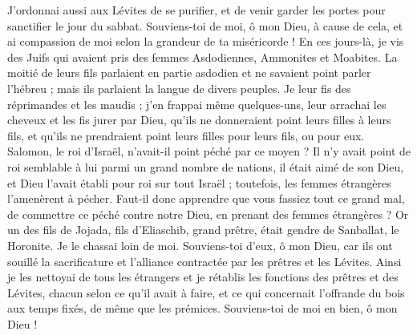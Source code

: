 \begin{multicols}{2}
J'ordonnai aussi aux Lévites de se purifier, et de venir garder les portes pour sanctifier le jour du sabbat. Souviens-toi de moi, ô mon Dieu, à cause de cela, et ai compassion de moi selon la grandeur de ta miséricorde !
En ces jours-là, je vis des Juifs qui avaient pris des femmes Asdodiennes, Ammonites et Moabites.
La moitié de leurs fils parlaient en partie asdodien et ne savaient point parler l'hébreu ; mais ils parlaient la langue de divers peuples.
Je leur fis des réprimandes et les maudis ; j'en frappai même quelques-uns, leur arrachai les cheveux et les fis jurer par Dieu, qu'ils ne donneraient point leurs filles à leurs fils, et qu'ils ne prendraient point leurs filles pour leurs fils, ou pour eux.
Salomon, le roi d'Israël, n'avait-il point péché par ce moyen ? Il n'y avait point de roi semblable à lui parmi un grand nombre de nations, il était aimé de son Dieu, et Dieu l'avait établi pour roi sur tout Israël ; toutefois, les femmes étrangères l'amenèrent à pécher.
Faut-il donc apprendre que vous fassiez tout ce grand mal, de commettre ce péché contre notre Dieu, en prenant des femmes étrangères ?
Or un des fils de Jojada, fils d'Eliaschib, grand prêtre, était gendre de Sanballat, le Horonite. Je le chassai loin de moi.
Souviens-toi d'eux, ô mon Dieu, car ils ont souillé la sacrificature et l'alliance contractée par les prêtres et les Lévites.
Ainsi je les nettoyai de tous les étrangers et je rétablis les fonctions des prêtres et des Lévites, chacun selon ce qu'il avait à faire,
et ce qui concernait l'offrande du bois aux temps fixés, de même que les prémices. Souviens-toi de moi en bien, ô mon Dieu !
\PPE{}
\end{multicols}
